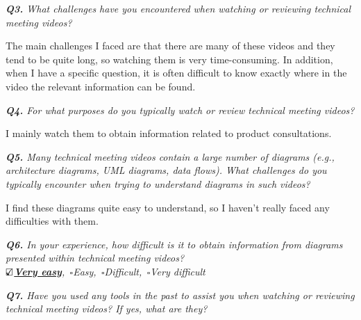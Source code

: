 \vspace*{1em}\noindent\textit{\textbf{Q3.} What challenges have you encountered when watching or reviewing technical meeting videos? 
}

\begin{samepage}
\begin{mdframed}[style=MyFrame]
The main challenges I faced are that there are many of these videos and they tend to be quite long, so watching them is very time-consuming. In addition, when I have a specific question, it is often difficult to know exactly where in the video the relevant information can be found.
\end{mdframed}
\end{samepage}

\vspace*{1em}\noindent\textit{\textbf{Q4.} For what purposes do you typically watch or review technical meeting videos?
}
\begin{samepage}
\begin{mdframed}[style=MyFrame]
I mainly watch them to obtain information related to product consultations.
\end{mdframed}
\end{samepage}



\vspace*{1em}\noindent\textit{\textbf{Q5.} Many technical meeting videos contain a large number of diagrams (e.g., architecture diagrams, UML diagrams, data flows). 
What challenges do you typically encounter when trying to understand diagrams in such videos?
}
\begin{samepage}
\begin{mdframed}[style=MyFrame]
I find these diagrams quite easy to understand, so I haven’t really faced any difficulties with them.
\end{mdframed}
\end{samepage}


\vspace*{1em}\noindent\textit{\textbf{Q6.} In your experience, how difficult is it to obtain information from diagrams presented within  technical meeting videos?
\\[.5em]
        \indent \underline{\bfseries$\text{\rlap{$\checkmark$}}\square$Very easy},\,
        $\square$Easy,\,
        $\square$Difficult,\,
        $\square$Very difficult
}



\vspace*{1em}\noindent\textit{\textbf{Q7.} Have you used any tools in the past to assist you when watching or reviewing technical meeting videos? If yes, what are they?
}

